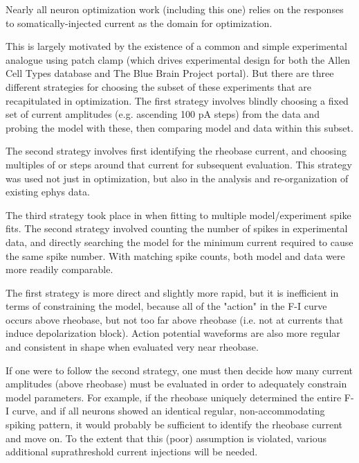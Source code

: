 Nearly all neuron optimization work (including this one) relies on the responses to somatically-injected current as the domain for optimization.

This is largely motivated by the existence of a common and simple experimental analogue using patch clamp (which drives experimental design for both the Allen Cell Types database and The Blue Brain Project portal).
But there are three different strategies for choosing the subset of these experiments that are recapitulated in optimization.
The first strategy involves blindly choosing a fixed set of current amplitudes (e.g. ascending 100 pA steps) from the data and probing the model with these, then comparing model and data within this subset.

The second strategy involves first identifying the rheobase current, and choosing multiples of or steps around that current for subsequent evaluation. This strategy was used not just in optimization, but also in the analysis and re-organization of existing ephys data.

The third strategy took place in when fitting to multiple model/experiment spike fits. The second strategy involved counting the number of spikes in experimental data, and directly searching the model for the minimum current required to cause the same spike number. With matching spike counts, both model and data were more readily comparable.

The first strategy is more direct and slightly more rapid, but it is inefficient in terms of constraining the model, because all of the "action" in the F-I curve occurs above rheobase, but not too far above rheobase (i.e. not at currents that induce depolarization block).
Action potential waveforms are also more regular and consistent in shape when evaluated very near rheobase. 

If one were to follow the second strategy, one must then decide how many current amplitudes (above rheobase) must be evaluated in order to adequately constrain model parameters.
For example, if the rheobase uniquely determined the entire F-I curve, and if all neurons showed an identical regular, non-accommodating spiking pattern, it would probably be sufficient to identify the rheobase current and move on. To the extent that this (poor) assumption is violated, various additional suprathreshold current injections will be needed. 


